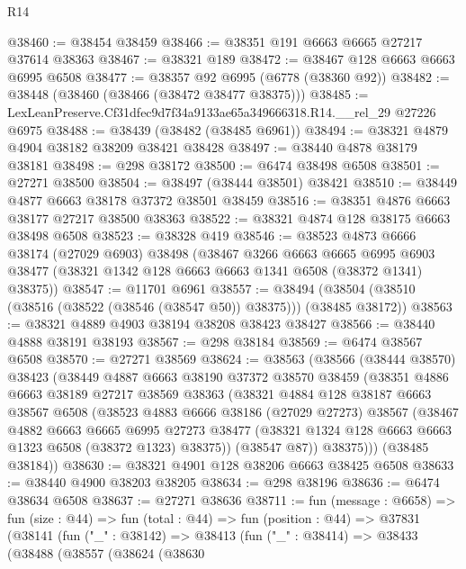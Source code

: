 \begin{lexlean}{R14}
\begin{coremodule}
@38460 := @38454 @38459
@38466 := @38351 @191 @6663 @6665 @27217 @37614 @38363
@38467 := @38321 @189
@38472 := @38467 @128 @6663 @6663 @6995 @6508
@38477 := @38357 @92 @6995 (@6778 (@38360 @92))
@38482 := @38448 (@38460 (@38466 (@38472 @38477 @38375)))
@38485 := LexLeanPreserve.Cf31dfec9d7f34a9133ae65a349666318.R14.__rel_29 @27226 @6975
@38488 := @38439 (@38482 (@38485 @6961))
@38494 := @38321 @4879 @4904 @38182 @38209 @38421 @38428
@38497 := @38440 @4878 @38179 @38181
@38498 := @298 @38172
@38500 := @6474 @38498 @6508
@38501 := @27271 @38500
@38504 := @38497 (@38444 @38501) @38421
@38510 := @38449 @4877 @6663 @38178 @37372 @38501 @38459
@38516 := @38351 @4876 @6663 @38177 @27217 @38500 @38363
@38522 := @38321 @4874 @128 @38175 @6663 @38498 @6508
@38523 := @38328 @419
@38546 := @38523
    @4873
    @6666
    @38174
    (@27029 @6903)
    @38498
    (@38467
      @3266
      @6663
      @6665
      @6995
      @6903
      @38477
      (@38321 @1342 @128 @6663 @6663 @1341 @6508 (@38372 @1341) @38375))
@38547 := @11701 @6961
@38557 := @38494 (@38504 (@38510 (@38516 (@38522 (@38546 (@38547 @50)) @38375))) (@38485 @38172))
@38563 := @38321 @4889 @4903 @38194 @38208 @38423 @38427
@38566 := @38440 @4888 @38191 @38193
@38567 := @298 @38184
@38569 := @6474 @38567 @6508
@38570 := @27271 @38569
@38624 := @38563
    (@38566
      (@38444 @38570)
      @38423
      (@38449
        @4887
        @6663
        @38190
        @37372
        @38570
        @38459
        (@38351
          @4886
          @6663
          @38189
          @27217
          @38569
          @38363
          (@38321
            @4884
            @128
            @38187
            @6663
            @38567
            @6508
            (@38523
              @4883
              @6666
              @38186
              (@27029 @27273)
              @38567
              (@38467
                @4882
                @6663
                @6665
                @6995
                @27273
                @38477
                (@38321 @1324 @128 @6663 @6663 @1323 @6508 (@38372 @1323) @38375))
              (@38547 @87))
            @38375)))
      (@38485 @38184))
@38630 := @38321 @4901 @128 @38206 @6663 @38425 @6508
@38633 := @38440 @4900 @38203 @38205
@38634 := @298 @38196
@38636 := @6474 @38634 @6508
@38637 := @27271 @38636
@38711 := fun (message : @6658) =>
  fun (size : @44) =>
  fun (total : @44) =>
  fun (position : @44) =>
  @37831
    (@38141
      (fun ("_" : @38142) =>
      @38413
        (fun ("_" : @38414) =>
        @38433
          (@38488
            (@38557
              (@38624
                (@38630

\end{coremodule}
\end{lexlean}
